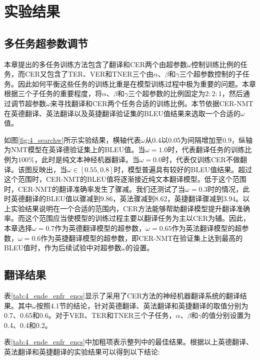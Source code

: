 \section{实验结果}

\subsection{多任务超参数调节}
\label{sec:4_omega}
本章提出的多任务训练方法包含了翻译和CER两个由超参数$\omega$控制训练比例的任务，而CER又包含了TER、VER和TNER三个由$\alpha$、$\beta$和$\gamma$三个超参数控制的子任务。因此如何平衡这些任务的训练比重是在模型训练过程中极为重要的问题。本章根据三个子任务的重要程度，将$\alpha$、$\beta$和$\gamma$三个超参数的比例固定为$2:2:1$，然后通过调节超参数$\omega$来寻找翻译和CER两个任务合适的训练比例。本节依据CER-NMT在英德翻译、英法翻译以及英捷翻译验证集的BLEU值结果来选取一个合适的$\omega$值。


如图\ref{fig:4_searchw}所示实验结果，横轴代表$\omega$从0.4以0.05为间隔增加至0.9，纵轴为NMT模型在英译德验证集上的BLEU值。当$\omega=1.0$时，代表翻译任务的训练比例为$100\%$，此时是纯文本神经机器翻译。当$\omega=0.0$时，代表仅训练CER不做翻译。该图反映出，当$\omega \in [0.55,0.8]$时，模型普遍具有较好的BLEU值结果。超过这个范围时，CER-NMT的BLEU值将逐渐接近纯文本翻译模型。低于这个范围时，CER-NMT的翻译准确率发生了骤减。我们还测试了当$\omega=0.3$时的情况，此时英德翻译的BLEU值以骤减到9.86，英法骤减到8.62，英捷翻译骤减到3.94。以上实验结果说明在一个合适的范围内，CER方法能够帮助翻译模型提升翻译准确率。而这个范围应当使模型的训练过程主要以翻译任务为主以CER为辅。因此，本章选择$\omega=0.7$作为英德翻译模型的超参数，$\omega=0.65$作为英法翻译模型的超参数，$\omega=0.6$作为英捷翻译模型的超参数，即CER-NMT在验证集上达到最高的BLEU值时，作为后续试验中对超参数$\omega$的设置。


\subsection{翻译结果}
\label{sec:4_translation_results}



表\ref{tab:4_ende_enfr_encs}显示了采用了CER方法的神经机器翻译系统的翻译结果。其中$\omega$按照4.1节的结论，针对英德翻译、英法翻译和英捷翻译的取值分别为0.7、0.65和0.6。对于VER、TER和TNER三个子任务，$\alpha$、$\beta$和$\gamma$的值分别设置为0.4、0.4和0.2。


表\ref{tab:4_ende_enfr_encs}中加粗项表示整列中的最佳结果。根据以上英德翻译、英法翻译和英捷翻译的实验结果可以得到以下结论:


